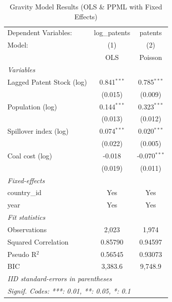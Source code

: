 
\begin{table}[htbp]
   \caption{\label{tab:gravity} Gravity Model Results (OLS \& PPML with Fixed Effects)}
   \centering
   \begin{tabular}{lcc}
      \tabularnewline \midrule \midrule
      Dependent Variables:      & log\_patents  & patents\\  
      Model:                    & (1)           & (2)\\  
                                &  OLS          & Poisson\\  
      \midrule
      \emph{Variables}\\
      Lagged Patent Stock (log) & 0.841$^{***}$ & 0.785$^{***}$\\   
                                & (0.015)       & (0.009)\\   
      Population (log)          & 0.144$^{***}$ & 0.323$^{***}$\\   
                                & (0.013)       & (0.012)\\   
      Spillover index (log)     & 0.074$^{***}$ & 0.020$^{***}$\\   
                                & (0.022)       & (0.005)\\   
      Coal cost (log)           & -0.018        & -0.070$^{***}$\\   
                                & (0.019)       & (0.011)\\   
      \midrule
      \emph{Fixed-effects}\\
      country\_id               & Yes           & Yes\\  
      year                      & Yes           & Yes\\  
      \midrule
      \emph{Fit statistics}\\
      Observations              & 2,023         & 1,974\\  
      Squared Correlation       & 0.85790       & 0.94597\\  
      Pseudo R$^2$              & 0.56545       & 0.93073\\  
      BIC                       & 3,383.6       & 9,748.9\\  
      \midrule \midrule
      \multicolumn{3}{l}{\emph{IID standard-errors in parentheses}}\\
      \multicolumn{3}{l}{\emph{Signif. Codes: ***: 0.01, **: 0.05, *: 0.1}}\\
   \end{tabular}
\end{table}


